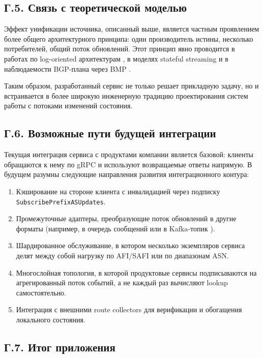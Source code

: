 \subsection*{Г.5. Связь с теоретической моделью}

Эффект унификации источника, описанный выше, является частным
проявлением более общего архитектурного принципа: один производитель
истины, несколько потребителей, общий поток обновлений. Этот принцип
явно проводится в работах по log-oriented архитектурам
\cite{kreps2011kafka,kleppmann2017ddia}, в моделях stateful
streaming \cite{akidau2015dataflow,carbone2015flink} и в
наблюдаемости BGP-плана через BMP \cite{rfc7854}.

Таким образом, разработанный сервис не только решает прикладную
задачу, но и встраивается в более широкую инженерную традицию
проектирования систем работы с потоками изменений состояния.

\subsection*{Г.6. Возможные пути будущей интеграции}

Текущая интеграция сервиса с продуктами компании является базовой:
клиенты обращаются к нему по gRPC и используют возвращаемые ответы
напрямую. В будущем разумны следующие направления развития
интеграционного контура:

\begin{enumerate}
\item Кэширование на стороне клиента с инвалидацией через подписку
\texttt{SubscribePrefixASUpdates}.
\item Промежуточные адаптеры, преобразующие поток обновлений в
другие форматы (например, в очередь сообщений или в Kafka-топик
\cite{kreps2011kafka}).
\item Шардированное обслуживание, в котором несколько экземпляров
сервиса делят между собой нагрузку по AFI/SAFI или по диапазонам
ASN.
\item Многослойная топология, в которой продуктовые сервисы
подписываются на агрегированный поток событий, а не каждый раз
вычисляют lookup самостоятельно.
\item Интеграция с внешними route collectors \cite{ripe-ris,
routeviews} для верификации и обогащения локального состояния.
\end{enumerate}

\subsection*{Г.7. Итог приложения}

